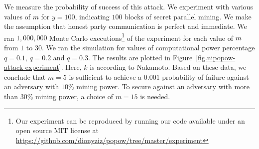 We measure the probability of success of this attack. We experiment with various
values of $m$ for $y = 100$, indicating $100$ blocks of secret parallel mining.
We make the assumption that honest party communication is perfect and immediate.
We ran $1{,}000{,}000$ Monte Carlo executions\ifanonymous\else\footnote{
Our experiment can be reproduced by running our code available under
an open source MIT license at
\url{https://github.com/dionyziz/popow/tree/master/experiment}}
\fi
of the experiment for each value
of $m$ from $1$ to $30$. We ran the simulation for values of computational power
percentage $q = 0.1$, $q = 0.2$ and $q = 0.3$. The results are plotted in
Figure~\ref{fig.nipopow-attack-experiment}.
Here, $k$ is according to Nakamoto. Based on these data, we conclude that $m = 5$
is sufficient to achieve a $0.001$ probability of failure against an adversary
with $10\%$ mining power. To secure against an adversary with more than $30\%$
mining power, a choice of $m = 15$ is needed.
